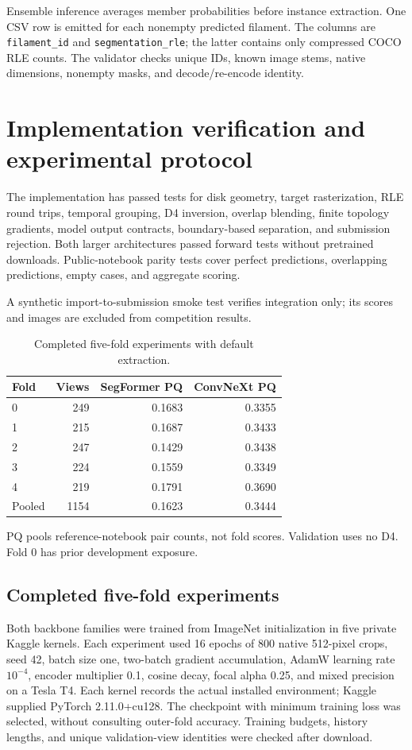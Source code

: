 \documentclass[conference]{IEEEtran}
\begin{document}
Ensemble inference averages member probabilities before instance extraction. One CSV row is emitted for each nonempty predicted filament. The columns are \texttt{filament\_id} and \texttt{segmentation\_rle}; the latter contains only compressed COCO RLE counts. The validator checks unique IDs, known image stems, native dimensions, nonempty masks, and decode/re-encode identity.

\section{Implementation verification and experimental protocol}
The implementation has passed tests for disk geometry, target rasterization, RLE round trips, temporal grouping, D4 inversion, overlap blending, finite topology gradients, model output contracts, boundary-based separation, and submission rejection. Both larger architectures passed forward tests without pretrained downloads. Public-notebook parity tests cover perfect predictions, overlapping predictions, empty cases, and aggregate scoring.

A synthetic import-to-submission smoke test verifies integration only; its scores and images are excluded from competition results.

\begin{table}[t]
\centering
\caption{Completed five-fold experiments with default extraction.}
\label{tab:folds}
\footnotesize
\setlength{\tabcolsep}{4pt}
\begin{tabular*}{\columnwidth}{@{\extracolsep{\fill}}lrrr@{}}
\toprule
Fold & Views & SegFormer PQ & ConvNeXt PQ\\
\midrule
0 & 249 & 0.1683 & 0.3355\\
1 & 215 & 0.1687 & 0.3433\\
2 & 247 & 0.1429 & 0.3438\\
3 & 224 & 0.1559 & 0.3349\\
4 & 219 & 0.1791 & 0.3690\\
\midrule
Pooled & 1154 & 0.1623 & 0.3444\\
\bottomrule
\end{tabular*}
\vspace{0.4ex}
\parbox{\columnwidth}{\raggedright PQ pools reference-notebook pair counts, not fold scores. Validation uses no D4. Fold 0 has prior development exposure.}
\end{table}

\subsection{Completed five-fold experiments}
Both backbone families were trained from ImageNet initialization in five private Kaggle kernels. Each experiment used 16 epochs of 800 native 512-pixel crops, seed 42, batch size one, two-batch gradient accumulation, AdamW learning rate $10^{-4}$, encoder multiplier 0.1, cosine decay, focal alpha 0.25, and mixed precision on a Tesla T4. Each kernel records the actual installed environment; Kaggle supplied PyTorch 2.11.0+cu128. The checkpoint with minimum training loss was selected, without consulting outer-fold accuracy. Training budgets, history lengths, and unique validation-view identities were checked after download.
\end{document}

